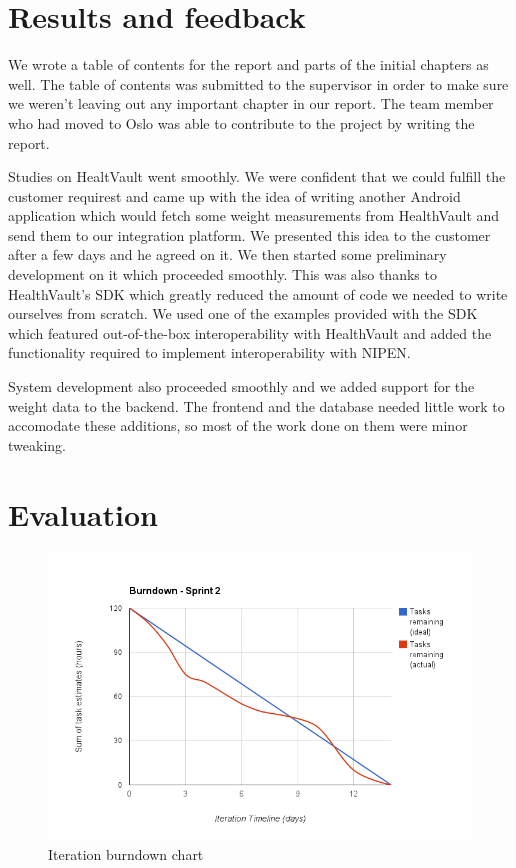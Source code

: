 \section{Results and feedback}

We wrote a table of contents for the report and parts of the initial chapters as well.
The table of contents was submitted to the supervisor in order to make sure we weren't leaving out any important chapter in our report. 
The team member who had moved to Oslo was able to contribute to the project by writing the report.

Studies on HealtVault went smoothly. We were confident that we could fulfill the customer requirest and came up with the idea of writing another Android application which would fetch some weight measurements from HealthVault and send them to our integration platform.
We presented this idea to the customer after a few days and he agreed on it.
We then started some preliminary development on it which proceeded smoothly.
This was also thanks to HealthVault's SDK which greatly reduced the amount of code we needed to write ourselves from scratch. 
We used one of the examples provided with the SDK which featured out-of-the-box interoperability with HealthVault and added the functionality required to implement interoperability with NIPEN.

System development also proceeded smoothly and we added support for the weight data to the backend.
The frontend and the database needed little work to accomodate these additions, so most of the work done on them were minor tweaking.

\section{Evaluation}

\begin{figure}
\centering
\includegraphics[scale=0.60]{../Figures/burndownSprint2.png}
\caption{Iteration burndown chart}
\label{figure:burndownsprint2}
\end{figure}

